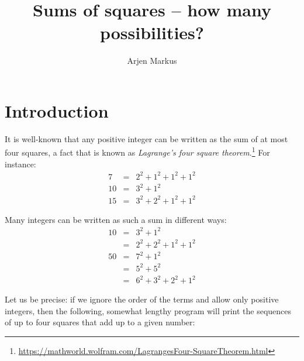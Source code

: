 \documentclass[onecolumn]{article}
\begin{document}
\title{Sums of squares -- how many possibilities?}

\author{Arjen Markus}

\maketitle

\section*{Introduction}
It is well-known that any positive integer can be written as the sum of at most four squares, a fact that is known as \emph{Lagrange's four square theorem}.\footnote{\url{https://mathworld.wolfram.com/LagrangesFour-SquareTheorem.html}}
For instance:
\begin{eqnarray*}
     7 &=& 2^2 + 1^2 + 1^2 + 1^2 \\
    10 &=& 3^2 + 1^2 \\
    15 &=& 3^2 + 2^2 + 1^2 + 1^2
\end{eqnarray*}

Many integers can be written as such a sum in different ways:
\begin{eqnarray*}
    10 &=& 3^2 + 1^2 \\
       &=& 2^2 + 2^2 + 1^2 + 1^2 \\
    50 &=& 7^2 + 1^2 \\
       &=& 5^2 + 5^2 \\
       &=& 6^2 + 3^2 + 2^2 + 1^2
\end{eqnarray*}

Let us be precise: if we ignore the order of the terms and allow only positive integers, then the following, somewhat lengthy program will print the
sequences of up to four squares that add up to a given number:
\end{document}
